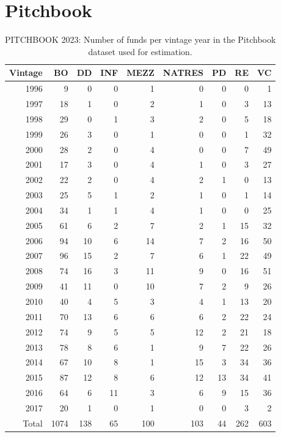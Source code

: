 \clearpage


\section{Pitchbook}
\label{sec:pitchbook}

\begin{table}[ht]
	\centering
	\begin{tabular}{rrrrrrrrr}
		Vintage & BO & DD & INF & MEZZ & NATRES & PD & RE & VC \\ 
		\hline
		\hline
		1996 &   9 &   0 &   0 &   1 &   0 &   0 &   0 &   1 \\ 
		1997 &  18 &   1 &   0 &   2 &   1 &   0 &   3 &  13 \\ 
		1998 &  29 &   0 &   1 &   3 &   2 &   0 &   5 &  18 \\ 
		1999 &  26 &   3 &   0 &   1 &   0 &   0 &   1 &  32 \\ 
		2000 &  28 &   2 &   0 &   4 &   0 &   0 &   7 &  49 \\ 
		2001 &  17 &   3 &   0 &   4 &   1 &   0 &   3 &  27 \\ 
		2002 &  22 &   2 &   0 &   4 &   2 &   1 &   0 &  13 \\ 
		2003 &  25 &   5 &   1 &   2 &   1 &   0 &   1 &  14 \\ 
		2004 &  34 &   1 &   1 &   4 &   1 &   0 &   0 &  25 \\ 
		2005 &  61 &   6 &   2 &   7 &   2 &   1 &  15 &  32 \\ 
		2006 &  94 &  10 &   6 &  14 &   7 &   2 &  16 &  50 \\ 
		2007 &  96 &  15 &   2 &   7 &   6 &   1 &  22 &  49 \\ 
		2008 &  74 &  16 &   3 &  11 &   9 &   0 &  16 &  51 \\ 
		2009 &  41 &  11 &   0 &  10 &   7 &   2 &   9 &  26 \\ 
		2010 &  40 &   4 &   5 &   3 &   4 &   1 &  13 &  20 \\ 
		2011 &  70 &  13 &   6 &   6 &   6 &   2 &  22 &  24 \\ 
		2012 &  74 &   9 &   5 &   5 &  12 &   2 &  21 &  18 \\ 
		2013 &  78 &   8 &   6 &   1 &   9 &   7 &  22 &  26 \\ 
		2014 &  67 &  10 &   8 &   1 &  15 &   3 &  34 &  36 \\ 
		2015 &  87 &  12 &   8 &   6 &  12 &  13 &  34 &  41 \\ 
		2016 &  64 &   6 &  11 &   3 &   6 &   9 &  15 &  36 \\ 
		2017 &  20 &   1 &   0 &   1 &   0 &   0 &   3 &   2 \\ 
		\hline
		Total & 1074 & 138 &  65 & 100 & 103 &  44 & 262 & 603 \\ 
		\hline
		\hline
	\end{tabular}
	\caption{PITCHBOOK 2023: Number of funds per vintage year in the Pitchbook dataset used for estimation.} 
	\label{tab:pitchbook_data}
\end{table}


